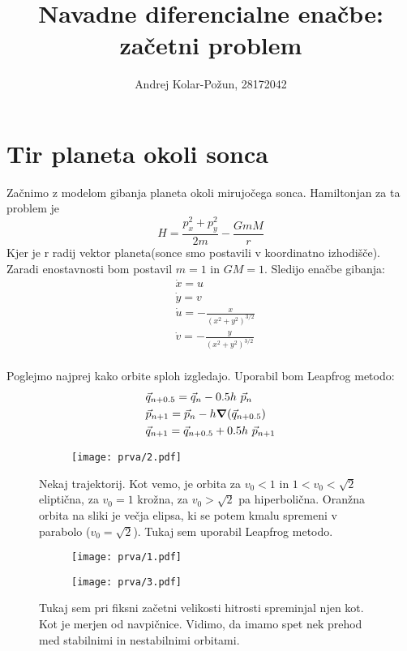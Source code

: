 \documentclass{article}
\title{Navadne diferencialne enačbe: začetni problem}
\author{Andrej Kolar-Požun, 28172042}
\begin{document}
\maketitle
\newpage
{}
\section{Tir planeta okoli sonca}

Začnimo z modelom gibanja planeta okoli mirujočega sonca. Hamiltonjan za ta problem je
\begin{equation*}
H = \frac{p_x^2 + p_y^2}{2m} - \frac{GmM}{r}
\end{equation*}
Kjer je r radij vektor planeta(sonce smo postavili v koordinatno izhodišče). Zaradi enostavnosti bom postavil $m=1$ in $GM = 1$.
Sledijo enačbe gibanja:
\begin{align*}
&\dot{x} = u \\
&\dot{y} = v \\
&\dot{u} = -\frac{x}{(x^2 + y^2)^{3/2}} \\
&\dot{v} = -\frac{y}{(x^2 + y^2)^{3/2}} \\
\end{align*}

Poglejmo najprej kako orbite sploh izgledajo. Uporabil bom Leapfrog metodo:
\begin{align*}
&\vec{q}_{n+0.5} = \vec{q}_n - 0.5 h \ \vec{p}_n \\
&\vec{p}_{n+1} = \vec{p}_n - h \grad (\vec{q}_{n+0.5}) \\
&\vec{q}_{n+1} = \vec{q}_{n+0.5} + 0.5 h \ \vec{p}_{n+1} \\
\end{align*}

\begin{figure}[H]
\centering
\begin{subfigure}{.7\textwidth}
\texttt{[image: prva/2.pdf]}
\end{subfigure}
\caption*{Nekaj trajektorij. Kot vemo, je orbita za $v_0<1$ in $1<v_0 < \sqrt{2}$ eliptična, za $v_0=1$ krožna, za $v_0 > \sqrt{2}$ pa hiperbolična. Oranžna orbita na sliki je večja elipsa, ki se potem kmalu spremeni v parabolo ($v_0 = \sqrt{2}$). Tukaj sem uporabil Leapfrog metodo.}
\end{figure}

\begin{figure}[H]
\centering
\begin{subfigure}{.49\textwidth}
\texttt{[image: prva/1.pdf]}
\end{subfigure}
\begin{subfigure}{.49\textwidth}
\texttt{[image: prva/3.pdf]}
\end{subfigure}
\caption*{Tukaj sem pri fiksni začetni velikosti hitrosti spreminjal njen kot. Kot je merjen od navpičnice. Vidimo, da imamo spet nek prehod med stabilnimi in nestabilnimi orbitami.}
\end{figure}
\end{document}
